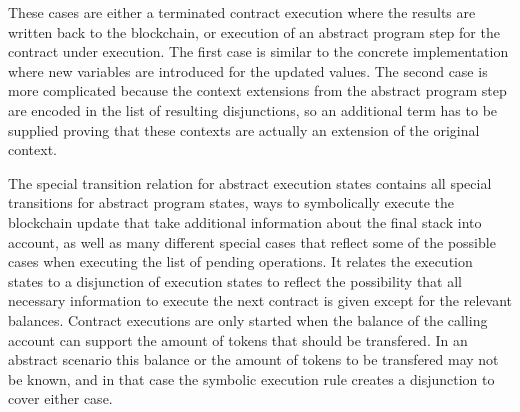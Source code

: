 These cases are either a terminated contract execution where the results are written back
to the blockchain, or execution of an abstract program step for the contract under execution.
The first case is similar to the concrete implementation where new variables are introduced
for the updated values.
The second case is more complicated because the context extensions from the abstract program step
are encoded in the list of resulting disjunctions,
so an additional term has to be supplied proving that these contexts are actually an extension
of the original context.

The special transition relation for abstract execution states
contains all special transitions for abstract program states,
ways to symbolically execute the blockchain update that take additional information about
the final stack into account,
as well as many different special cases that reflect some of the possible cases
when executing the list of pending operations.
It relates the execution states to a disjunction of execution states to reflect the possibility
that all necessary information to execute the next contract is given except for the
relevant balances.
Contract executions are only started when the balance of the calling account can support
the amount of tokens that should be transfered.
In an abstract scenario this balance or the amount of tokens to be transfered may not be known,
and in that case the symbolic execution rule creates a disjunction to cover either case.

